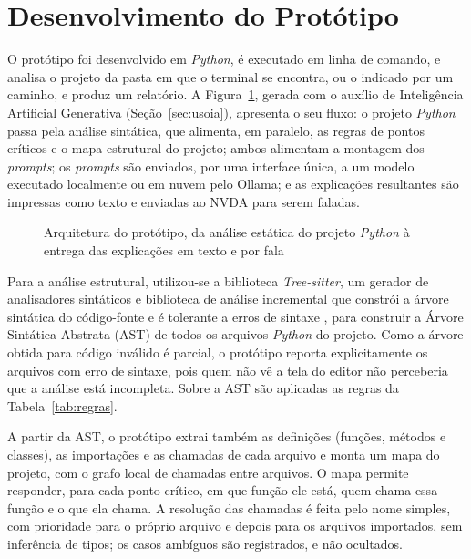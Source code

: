 \documentclass[
    12pt,                   %
    openright,              %
    oneside,                %
    a4paper,                %
    sumario=tradicional,    %
    english,                %
    brazil,                 %
    ]{abntex2}
\begin{document}
\section{Desenvolvimento do Protótipo}\label{sec:prototipo}

O protótipo foi desenvolvido em \textit{Python}, é executado em linha de comando, e analisa o projeto da pasta em que o terminal se encontra, ou o indicado por um caminho, e produz um relatório. A Figura~\ref{fig:arquitetura}, gerada com o auxílio de Inteligência Artificial Generativa (Seção~\ref{sec:usoia}), apresenta o seu fluxo: o projeto \textit{Python} passa pela análise sintática, que alimenta, em paralelo, as regras de pontos críticos e o mapa estrutural do projeto; ambos alimentam a montagem dos \textit{prompts}; os \textit{prompts} são enviados, por uma interface única, a um modelo executado localmente ou em nuvem pelo Ollama; e as explicações resultantes são impressas como texto e enviadas ao NVDA para serem faladas.

\begin{figure}[htbp]
  \centering
  
  \caption{Arquitetura do protótipo, da análise estática do projeto \textit{Python} à entrega das explicações em texto e por fala}
  \label{fig:arquitetura}
\end{figure}

\break

Para a análise estrutural, utilizou-se a biblioteca \textit{Tree-sitter}, um gerador de analisadores sintáticos e biblioteca de análise incremental que constrói a árvore sintática do código-fonte e é tolerante a erros de sintaxe \cite{treesitter}, para construir a Árvore Sintática Abstrata (AST) de todos os arquivos \textit{Python} do projeto. Como a árvore obtida para código inválido é parcial, o protótipo reporta explicitamente os arquivos com erro de sintaxe, pois quem não vê a tela do editor não perceberia que a análise está incompleta. Sobre a AST são aplicadas as regras da Tabela~\ref{tab:regras}.

A partir da AST, o protótipo extrai também as definições (funções, métodos e classes), as importações e as chamadas de cada arquivo e monta um mapa do projeto, com o grafo local de chamadas entre arquivos. O mapa permite responder, para cada ponto crítico, em que função ele está, quem chama essa função e o que ela chama. A resolução das chamadas é feita pelo nome simples, com prioridade para o próprio arquivo e depois para os arquivos importados, sem inferência de tipos; os casos ambíguos são registrados, e não ocultados.
\end{document}
